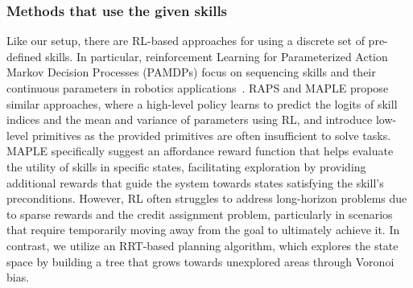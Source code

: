 \subsubsection{Methods that use the given skills}
\fi
Like our setup, there are RL-based approaches for using a discrete set of pre-defined skills. In particular, reinforcement Learning for Parameterized Action Markov Decision Processes (PAMDPs) \cite{hausknecht2015deep, masson2016reinforcement} focus on sequencing skills and their continuous parameters in robotics applications~\cite{dalal2021accelerating, nasiriany2022augmenting, jiang2024hacmanpp}. RAPS \cite{dalal2021accelerating} and MAPLE \cite{nasiriany2022augmenting} propose similar approaches, where a high-level policy learns to predict the logits of skill indices and the mean and variance of parameters using RL, and introduce low-level primitives as the provided primitives are often insufficient to solve tasks. MAPLE specifically suggest an affordance reward function that helps evaluate the utility of skills in specific states, facilitating exploration by providing additional rewards that guide the system towards states satisfying the skill's preconditions. However, RL often struggles to address long-horizon problems due to sparse rewards and the credit assignment problem, particularly in scenarios that require temporarily moving away from the goal to ultimately achieve it. In contrast, we utilize an RRT-based planning algorithm, which explores the state space by building a tree that grows towards unexplored areas through Voronoi bias.






